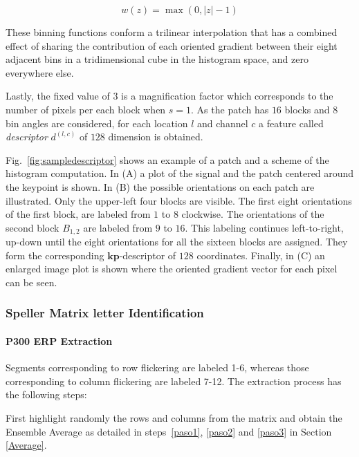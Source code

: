 \documentclass[utf8]{frontiersSCNS} %
\begin{document}
\begin{equation}
 w(z) = \max(0,|z|-1)
\label{eq:weighting}
\end{equation}

These binning functions conform a trilinear interpolation that has a combined effect of sharing the contribution of each oriented gradient between their eight adjacent bins in a tridimensional cube in the histogram space, and zero everywhere else.

Lastly, the fixed value of $ 3 $ is a magnification factor which corresponds to the number of pixels per each block when $s = 1$.  As the patch has  $16$ blocks and  $8$ bin angles are considered, for each location $l$ and channel $c$ a feature called \textit{descriptor} $d^{(l,c)}$  of $128$ dimension is obtained. 

Fig.~\ref{fig:sampledescriptor} shows an example of a patch and a scheme of the histogram computation. In (A) a plot of the signal and the patch centered around the keypoint is shown. In (B) the possible orientations on each patch are illustrated.  Only the upper-left four blocks are visible.  The first eight orientations of the first block, are labeled from $1$ to $8$ clockwise. The orientations of the second block $ B_{1,2} $ are labeled from $9$ to $16$.  This labeling continues left-to-right, up-down until the eight orientations for all the sixteen blocks are assigned. They form the corresponding $\mathbf{kp}$-descriptor of $128$ coordinates. Finally, in (C) an enlarged image plot is shown where the oriented gradient vector for each pixel can be seen.
 
\subsubsection{Speller Matrix letter Identification}
\label{Classification}

\paragraph{P300 ERP Extraction}
Segments corresponding to row flickering are labeled 1-6, whereas those corresponding to column flickering are labeled 7-12.  The extraction process has the following steps:

First highlight randomly the rows and columns from the matrix and obtain the Ensemble Average as detailed in steps~\ref{paso1}, \ref{paso2} and \ref{paso3} in Section \ref{Average}.
\end{document}
